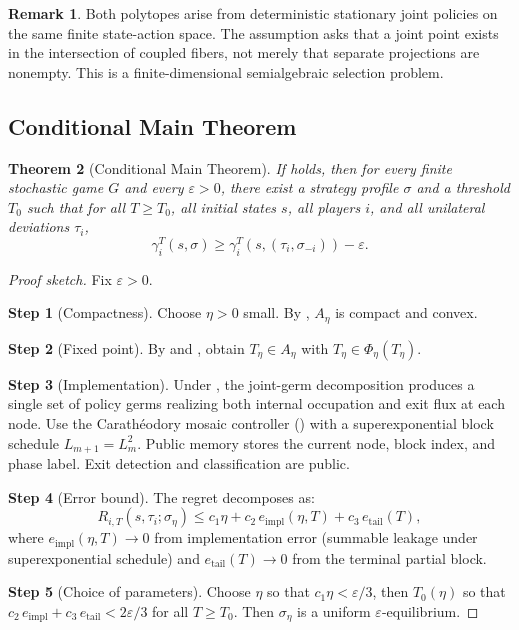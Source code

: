 \documentclass[12pt,a4paper]{article}
\newtheorem{theorem}{Theorem}[section]
\theoremstyle{definition}
\newtheorem{remark}[theorem]{Remark}
\newcommand{\eps}{\varepsilon}
\begin{document}
\begin{remark}
Both polytopes arise from deterministic stationary joint policies on the same finite state-action space. The assumption asks that a joint point exists in the intersection of coupled fibers, not merely that separate projections are nonempty. This is a finite-dimensional semialgebraic selection problem.
\end{remark}

\subsection{Conditional Main Theorem}

\begin{theorem}[Conditional Main Theorem]
\label{thm:main}
If  holds, then for every finite stochastic game $G$ and every $\eps > 0$, there exist a strategy profile $\sigma$ and a threshold $T_0$ such that for all $T \geq T_0$, all initial states $s$, all players $i$, and all unilateral deviations $\tau_i$,
\[
\gamma_i^T(s, \sigma) \geq \gamma_i^T(s, (\tau_i, \sigma_{-i})) - \eps.
\]
\end{theorem}

\begin{proof}[Proof sketch]
Fix $\eps > 0$.

\textbf{Step 1} (Compactness). Choose $\eta > 0$ small. By , $A_\eta$ is compact and convex.

\textbf{Step 2} (Fixed point). By  and , obtain $T_\eta \in A_\eta$ with $T_\eta \in \Phi_\eta(T_\eta)$.

\textbf{Step 3} (Implementation). Under , the joint-germ decomposition produces a single set of policy germs realizing both internal occupation and exit flux at each node. Use the Carath\'eodory mosaic controller () with a superexponential block schedule $L_{m+1} = L_m^2$. Public memory stores the current node, block index, and phase label. Exit detection and classification are public.

\textbf{Step 4} (Error bound). The regret decomposes as:
\[
R_{i,T}(s, \tau_i; \sigma_\eta) \leq c_1 \eta + c_2 \, e_{\mathrm{impl}}(\eta, T) + c_3 \, e_{\mathrm{tail}}(T),
\]
where $e_{\mathrm{impl}}(\eta, T) \to 0$ from implementation error (summable leakage under superexponential schedule) and $e_{\mathrm{tail}}(T) \to 0$ from the terminal partial block.

\textbf{Step 5} (Choice of parameters). Choose $\eta$ so that $c_1 \eta < \eps/3$, then $T_0(\eta)$ so that $c_2 \, e_{\mathrm{impl}} + c_3 \, e_{\mathrm{tail}} < 2\eps/3$ for all $T \geq T_0$. Then $\sigma_\eta$ is a uniform $\eps$-equilibrium.
\end{proof}
\end{document}
